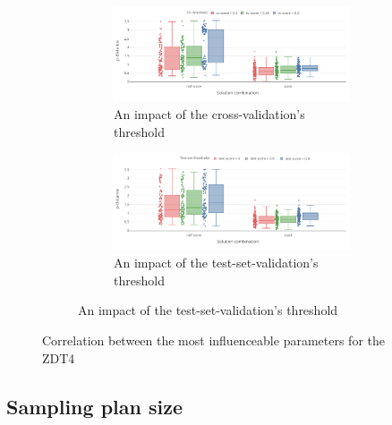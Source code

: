     \begin{figure}
        \centering
        \begin{subfigure}{\textwidth}
            \begin{subfigure}{0.45\textwidth}
                \includegraphics[width=\textwidth]{content/images/conf_zdt4_cv_score}
                \caption{An impact of the cross-validation's threshold}
                \label{fig:zdt4_pred_solver}
            \end{subfigure} 
            \begin{subfigure}{0.45\textwidth}
                \includegraphics[width=\textwidth]{content/images/conf_zdt4_test_score}
                \caption{An impact of the test-set-validation's threshold}
                \label{fig:zdt4_comb_valid}
            \end{subfigure}
        \end{subfigure}


        \caption[Correlation between the most influenceable parameters for the ZDT4]{Correlation between the most influenceable parameters for the ZDT4} 
        \label{fig:conf_zdt4_sign}    
    \end{figure}

    \subsection{Sampling plan size}

